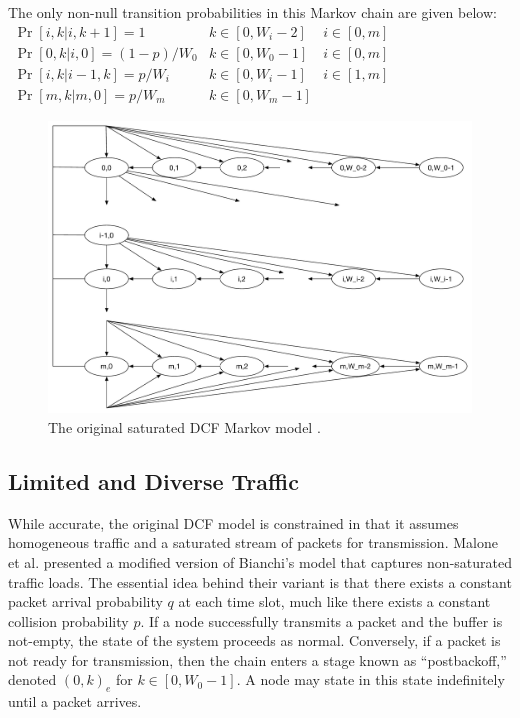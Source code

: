 \documentclass[conference]{IEEEtran}
\begin{document}
The only non-null transition probabilities in this Markov chain are given below:
\begin{math}
\boxed{
\begin{array}{lll}
\Pr[i,k | i, k + 1] = 1 & k \in [0, W_i - 2] & i \in [0,m] \\
\Pr[0,k | i, 0] = (1-p)/W_0 & k \in [0, W_0 - 1] & i \in [0,m] \\
\Pr[i,k | i-1, k] = p/W_i & k \in [0, W_i - 1] & i \in [1,m] \\
\Pr[m,k | m,0] = p/W_m & k \in [0, W_m - 1] & ~
\end{array}
}
\end{math}

\begin{figure}
\begin{center}
\includegraphics[scale=0.5]{../sketches/dcf_model.pdf}
\caption{The original saturated DCF Markov model \cite{dcf}.}
\label{fig:dcf_model}
\end{center}
\end{figure}

\subsection{Limited and Diverse Traffic}
While accurate, the original DCF model is constrained in that it assumes homogeneous traffic and a saturated stream of packets for transmission. Malone et al. \cite{dcf-nonsaturated} presented a modified version of Bianchi's model that captures non-saturated traffic loads. The essential idea behind their variant is that there exists a constant packet arrival probability $q$ at each time slot, much like there exists a constant collision probability $p$. If a node successfully transmits a packet and the buffer is not-empty, the state of the system proceeds as normal. Conversely, if a packet is not ready for transmission, then the chain enters a stage known as ``postbackoff,'' denoted $(0,k)_e$ for $k \in [0, W_0-1]$. A node may state in this state indefinitely until a packet arrives. 
\end{document}
